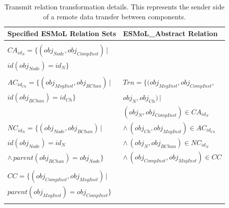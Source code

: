 \begin{table}
\begin{tabular}[width=0.5\columnwidth]{ | l | l | }
 \hline
 \textbf{Specified ESMoL Relation Sets} & \textbf{ESMoL\_Abstract Relation} \\
 \hline \hline
                                                                        & \\
 $CA_{id_N} = \{ (obj_{Node}, obj_{CompInst} ) \, |$                    & \\
 \hspace{1.7cm} $ id(obj_{Node}) = id_N \} $                            & \\
                                                                        & \\
 $AC_{id_{Ch}} = \{ (obj_{MsgInst}, obj_{BChan} ) \, |$          
   & 
$ Trn = \{(obj_{MsgInst}, obj_{CompInst}, $  \\
 \hspace{1.6cm} $id(obj_{BChan}) = id_{Ch} \} $                         & 
\hspace{1.3cm} $obj_{N}, obj_{Ch}) \, |$ \\
                                                                        &  
\hspace{0.8cm} $(obj_{N}, obj_{CompInst}) \in CA_{id_N}$ \\
 $NC_{id_N} = \{ (obj_{Node}, obj_{BChan}) \, | $                       & 
\hspace{0.5cm} $ \wedge \, (obj_{Ch}, obj_{MsgInst}) \in AC_{id_{Ch}}$ \\
 \hspace{1.35cm} $id(obj_{Node}) = id_N $                               &
\hspace{0.5cm} $ \wedge \, (obj_{N}, obj_{BChan}) \in NC_{id_N}$ \\ 
 \hspace{1cm} $ \wedge \, parent(obj_{BChan} ) = obj_{Node} \}$         &
\hspace{0.5cm} $ \wedge \, (obj_{CompInst}, obj_{MsgInst}) \in CC $ \\
                                                                        & \\
 $CC = \{ (obj_{CompInst}, obj_{MsgInst} ) \, | $                       & \\
 \hspace{0.7cm} $parent(obj_{MsgInst} ) = obj_{CompInst} \}$            & \\ 
                                                                        & \\
 \hline
\end{tabular}
	\caption{Transmit relation transformation details. This represents the
sender side of a remote data transfer between components.}
	\label{tab:transmit}
\end{table}

